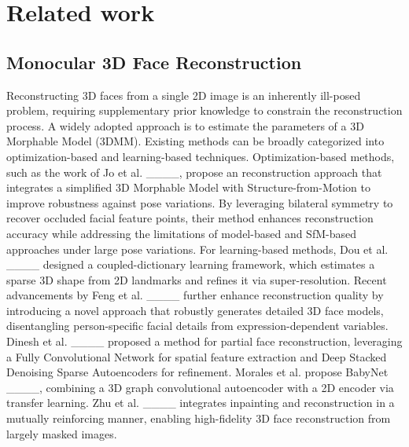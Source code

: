 \section{Related work}
\subsection{Monocular 3D Face Reconstruction} 
Reconstructing 3D faces from a single 2D image is an inherently ill-posed problem, requiring supplementary prior knowledge to constrain the reconstruction process. A widely adopted approach is to estimate the parameters of a 3D Morphable Model (3DMM). Existing methods can be broadly categorized into optimization-based and learning-based techniques. Optimization-based methods, such as the work of Jo et al. ____, propose an reconstruction approach that integrates a simplified 3D Morphable Model with Structure-from-Motion to improve robustness against pose variations. By leveraging bilateral symmetry to recover occluded facial feature points, their method enhances reconstruction accuracy while addressing the limitations of model-based and SfM-based approaches under large pose variations. For learning-based methods, Dou et al. ____ designed a coupled-dictionary learning framework, which estimates a sparse 3D shape from 2D landmarks and refines it via super-resolution. Recent advancements by Feng et al. ____ further enhance reconstruction quality by introducing a novel approach that robustly generates detailed 3D face models, disentangling person-specific facial details from expression-dependent variables. Dinesh et al. ____ proposed a method for partial face reconstruction, leveraging a Fully Convolutional Network for spatial feature extraction and Deep Stacked Denoising Sparse Autoencoders for refinement. Morales et al. propose BabyNet ____, combining a 3D graph convolutional autoencoder with a 2D encoder via transfer learning. Zhu et al. ____ integrates inpainting and reconstruction in a mutually reinforcing manner, enabling high-fidelity 3D face reconstruction from largely masked images.

